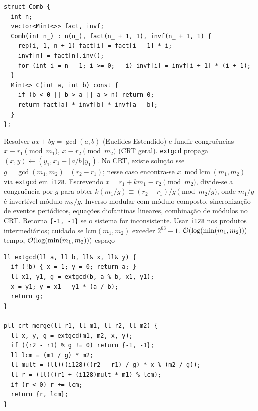 \begin{lstlisting}
struct Comb {
  int n;
  vector<Mint<>> fact, invf;
  Comb(int n_) : n(n_), fact(n_ + 1, 1), invf(n_ + 1, 1) {
    rep(i, 1, n + 1) fact[i] = fact[i - 1] * i;
    invf[n] = fact[n].inv();
    for (int i = n - 1; i >= 0; --i) invf[i] = invf[i + 1] * (i + 1);
  }
  Mint<> C(int a, int b) const {
    if (b < 0 || b > a || a > n) return 0;
    return fact[a] * invf[b] * invf[a - b];
  }
};
\end{lstlisting}

\algobox
  {Resolver $ax + by = \gcd(a, b)$ (Euclides Estendido) e fundir congruências $x \equiv r_1 \pmod{m_1}$, $x \equiv r_2 \pmod{m_2}$ (CRT geral).}
  {\texttt{extgcd} propaga $(x, y) \leftarrow (y_1, x_1 - \lfloor a/b \rfloor y_1)$. No CRT, existe solução sse $g = \gcd(m_1, m_2) \mid (r_2 - r_1)$; nesse caso encontra-se $x \bmod \text{lcm}(m_1, m_2)$ via \texttt{extgcd} em \texttt{i128}.}
  {Escrevendo $x = r_1 + k m_1 \equiv r_2 \pmod{m_2}$, divide-se a congruência por $g$ para obter $k (m_1/g) \equiv (r_2 - r_1)/g \pmod{m_2/g}$, onde $m_1/g$ é invertível módulo $m_2/g$.}
  {Inverso modular com módulo composto, sincronização de eventos periódicos, equações diofantinas lineares, combinação de módulos no CRT.}
  {Retorna \texttt{\{-1, -1\}} se o sistema for inconsistente. Usar \texttt{i128} nos produtos intermediários; cuidado se $\text{lcm}(m_1, m_2)$ exceder $2^{63}-1$.}
  {$\mathcal{O}(\log(\min(m_1, m_2)))$ tempo, $\mathcal{O}(\log(\min(m_1, m_2)))$ espaço}

\begin{lstlisting}
ll extgcd(ll a, ll b, ll& x, ll& y) {
  if (!b) { x = 1; y = 0; return a; }
  ll x1, y1, g = extgcd(b, a % b, x1, y1);
  x = y1; y = x1 - y1 * (a / b);
  return g;
}

pll crt_merge(ll r1, ll m1, ll r2, ll m2) {
  ll x, y, g = extgcd(m1, m2, x, y);
  if ((r2 - r1) % g != 0) return {-1, -1};
  ll lcm = (m1 / g) * m2;
  ll mult = (ll)((i128)((r2 - r1) / g) * x % (m2 / g));
  ll r = (ll)((r1 + (i128)mult * m1) % lcm);
  if (r < 0) r += lcm;
  return {r, lcm};
}
\end{lstlisting}

